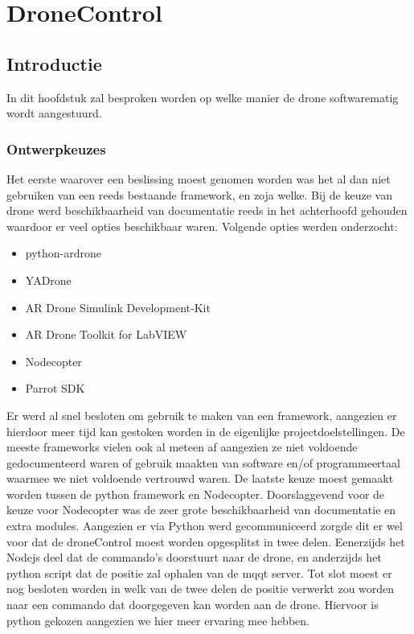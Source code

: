 \chapter{DroneControl}

\section{Introductie} \label{sec:initiele_planning}

In dit hoofdstuk zal besproken worden op welke manier de drone softwarematig wordt aangestuurd.

\subsection{Ontwerpkeuzes}

Het eerste waarover een beslissing moest genomen worden was het al dan niet gebruiken van een reeds bestaande framework, en zoja welke. Bij de keuze van drone werd beschikbaarheid van documentatie reeds in het achterhoofd gehouden waardoor er veel opties beschikbaar waren. Volgende opties werden onderzocht:

\begin{itemize}
\item python-ardrone
\item YADrone
\item AR Drone Simulink Development-Kit
\item AR Drone Toolkit for LabVIEW
\item Nodecopter
\item Parrot SDK
\end{itemize}

Er werd al snel besloten om gebruik te maken van een framework, aangezien er hierdoor meer tijd kan gestoken worden in de eigenlijke projectdoelstellingen. De meeste frameworks vielen ook al meteen af aangezien ze niet voldoende gedocumenteerd waren of gebruik maakten van software en/of programmeertaal waarmee we niet voldoende vertrouwd waren. De laatste keuze moest gemaakt worden tussen de python framework en Nodecopter. Doorslaggevend voor de keuze voor Nodecopter was de zeer grote beschikbaarheid van documentatie en extra modules. Aangezien er via Python werd gecommuniceerd zorgde dit er wel voor dat de droneControl moest worden opgesplitst in twee delen. Eenerzijds het Nodejs deel dat de commando's doorstuurt naar de drone, en anderzijds het python script dat de positie zal ophalen van de mqqt server. Tot slot moest er nog besloten worden in welk van de twee delen de positie verwerkt zou worden naar een commando dat doorgegeven kan worden aan de drone. Hiervoor is python gekozen aangezien we hier meer ervaring mee hebben.




